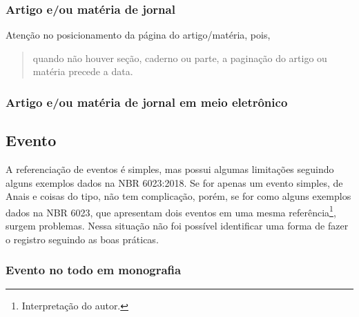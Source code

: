   \exOutros

\subsubsection{Artigo e/ou matéria de jornal} %
  Atenção no posicionamento da página do artigo/matéria, pois, \blockcquote[p. 15]{livro:abnt-nbr6023:2018}{quando não houver seção, caderno ou parte, a paginação do artigo ou matéria precede a data.}

  \exEssencial
  
  \exOutros

\subsubsection{Artigo e/ou matéria de jornal em meio eletrônico} %
  \exEssencial

  \exOutros

\subsection{Evento} %
A referenciação de eventos é simples, mas possui algumas limitações seguindo alguns exemplos dados na NBR 6023:2018. Se for apenas um evento simples, de Anais e coisas do tipo, não tem complicação, porém, se for como alguns exemplos dados na NBR 6023, que apresentam dois eventos em uma mesma referência\footnote{Interpretação do autor.}, surgem problemas. Nessa situação não foi possível identificar uma forma de fazer o registro seguindo as boas práticas.

\subsubsection{Evento no todo em monografia} %
  \exEssencial

